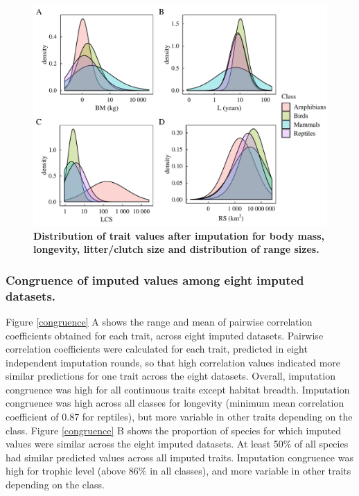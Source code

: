 \begin{figure}[h!]
\centering
\includegraphics[scale=0.7]{figures/chapter2/Imputation_errors/Distributions}
\caption[Distribution of trait values after imputation for body mass, longevity, litter/clutch size and distribution of range sizes]{\textbf{Distribution of trait values after imputation for body mass, longevity, litter/clutch size and distribution of range sizes.}}
\label{traitdist}
\end{figure}


\pagebreak
\subsubsection{Congruence of imputed values among eight imputed datasets.}

Figure \ref{congruence} A shows the range and mean of pairwise correlation coefficients obtained for each trait, across eight imputed datasets. Pairwise correlation coefficients were calculated for each trait, predicted in eight independent imputation rounds, so that high correlation  values indicated more similar predictions for one trait across the eight datasets. Overall, imputation congruence was high for all continuous traits except habitat breadth. Imputation congruence was high across all classes for longevity (minimum mean correlation coefficient of 0.87 for reptiles), but more variable in other traits depending on the class.
Figure \ref{congruence} B shows the proportion of species for which imputed values were similar across the eight imputed datasets. At least 50\% of all species had similar predicted values across all imputed traits. Imputation congruence was high for trophic level (above 86\% in all classes), and more variable in other traits depending on the class. 

